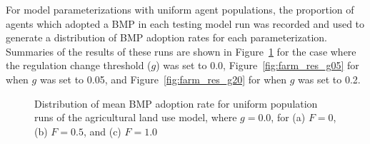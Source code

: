 For model parameterizations with uniform agent populations,
the proportion of agents which adopted a BMP in each testing model run
was recorded and used to generate a distribution of BMP adoption rates
for each parameterization.
Summaries of the results of these runs are shown
in Figure~\ref{fig:farm_res_g00} for the case where the regulation change
threshold ($g$) was set to 0.0,
Figure~\ref{fig:farm_res_g05} for when $g$ was set to 0.05, and 
Figure~\ref{fig:farm_res_g20} for when $g$ was set to 0.2.

\begin{figure}[p]
    \hfill
    \hfill
    \caption{Distribution of mean BMP adoption rate for uniform population
        runs of the agricultural land use model, where $g=0.0$,
        for (a) $F=0$, (b) $F=0.5$, and (c) $F=1.0$}
    \label{fig:farm_res_g00}
\end{figure}

